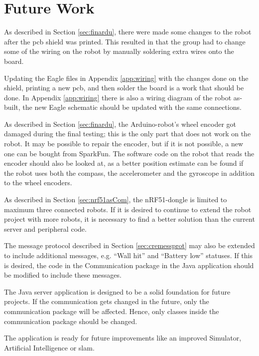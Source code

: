 \chapter{Future Work}
        \label{sec:fwSkjold}
        As described in Section \ref{sec:finardu}, there were made some changes to the robot after the \acrshort{pcb} shield was printed. This resulted in that the group had to change some of the wiring on the robot by manually soldering extra wires onto the board.

        Updating the Eagle files in Appendix \ref{app:wiring} with the changes done on the shield, printing a new \acrshort{pcb}, and then solder the board is a work that should be done. In Appendix \ref{app:wiring} there is also a wiring diagram of the robot as-built, the new Eagle schematic should be updated with the same connections.

        As described in Section \ref{sec:finardu}, the Arduino-robot's wheel encoder got damaged during the final testing; this is the only part that does not work on the robot. It may be possible to repair the encoder, but if it is not possible, a new one can be bought from SparkFun\cite{sparkfun}. The software code on the robot that reads the encoder should also be looked at, as a better position estimate can be found if the robot uses both the compass, the accelerometer and the gyroscope in addition to the wheel encoders.

        As described in Section \ref{sec:nrf51asCom}, the nRF51-dongle is limited to maximum three connected robots. If it is desired to continue to extend the robot project with more robots, it is necessary to find a better solution than the current server and peripheral code.

        The message protocol described in Section \ref{sec:cremessprot} may also be extended to include additional messages, e.g. ``Wall hit'' and ``Battery low'' statuses. If this is desired, the code in the Communication package in the Java application should be modified to include these messages.
        
        The Java server application is designed to be a solid foundation for future projects. If the communication gets changed in the future, only the communication package will be affected. Hence, only classes inside the communication package should be changed.

        The application is ready for future improvements like an improved Simulator, Artificial Intelligence or \acrshort{slam}.